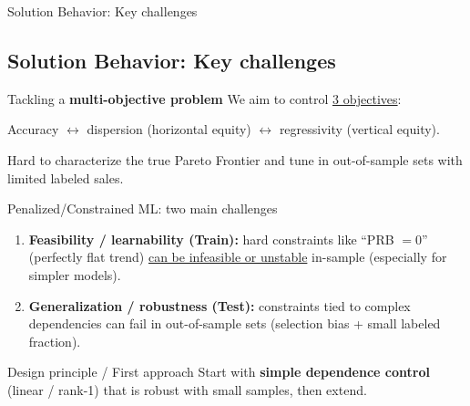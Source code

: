 \documentclass[aspectratio=169,10pt]{beamer}
\begin{document}
\newcommand{\frameJ}{Solution Behavior: Key challenges}
\begin{frame}{\frameJ}
\subsection{\frameJ}
\begin{block}{ Tackling a \textbf{multi-objective problem}}
We aim to control \underline{3 objectives}:
\begin{center}    
Accuracy \(\leftrightarrow\) dispersion (horizontal equity) \(\leftrightarrow\) regressivity (vertical equity). 
\end{center}
Hard to characterize the true Pareto Frontier and tune in out-of-sample sets with limited labeled sales.
\end{block}

\begin{block}{ Penalized/Constrained ML: two main challenges}
\begin{enumerate}
  \item \textbf{Feasibility / learnability (Train):} hard constraints like ``PRB \(=0\)'' (perfectly flat trend) \underline{can be infeasible or unstable} in-sample (especially for simpler models).
  \item \textbf{Generalization / robustness (Test):} constraints tied to complex dependencies can fail in out-of-sample sets (selection bias + small labeled fraction).
\end{enumerate}
\end{block}

\begin{block}{ Design principle / First approach}
Start with \textbf{simple dependence control} (linear / rank-1) that is robust with small samples, then extend.
\end{block}
\end{frame}







\end{document}
